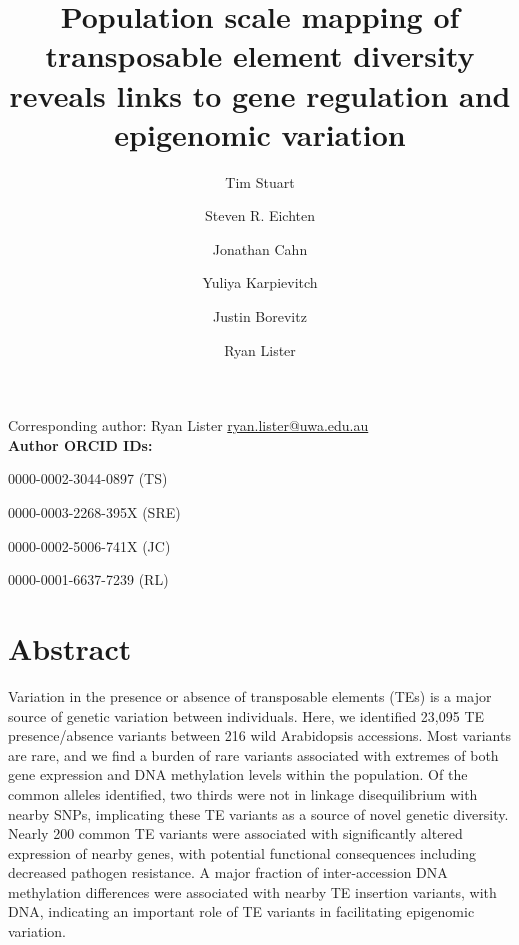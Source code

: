 \documentclass[12pt]{article}
\date{}
\begin{document}
\title{Population scale mapping of transposable element diversity reveals links to gene regulation and epigenomic variation}

\author[1]{Tim Stuart}
\author[2]{Steven R. Eichten}
\author[1]{Jonathan Cahn}
\author[1]{Yuliya Karpievitch}
\author[2]{Justin Borevitz}
\author[1]{Ryan Lister}

\renewcommand\Authands{ and }

\maketitle

Corresponding author: Ryan Lister \href{mailto:ryan.lister@uwa.edu.au}{ryan.lister@uwa.edu.au} \\

\textbf{Author ORCID IDs:}

0000-0002-3044-0897 (TS)

0000-0003-2268-395X (SRE)

0000-0002-5006-741X (JC)

0000-0001-6637-7239 (RL)


\linenumbers

\section{Abstract}

Variation in the presence or absence of transposable elements (TEs) is a
major source of genetic variation between individuals. Here, we
identified 23,095 TE presence/absence variants between 216 wild
Arabidopsis accessions. Most variants are rare, and we find a burden of
rare variants associated with extremes of both gene expression and DNA
methylation levels within the population. Of the common alleles
identified, two thirds were not in linkage disequilibrium with nearby
SNPs, implicating these TE variants as a source of novel genetic
diversity. Nearly 200 common TE variants were associated with
significantly altered expression of nearby genes, with potential
functional consequences including decreased pathogen resistance. A major
fraction of inter-accession DNA methylation differences were associated
with nearby TE insertion variants, with DNA, indicating an important
role of TE variants in facilitating epigenomic variation.
\end{document}
